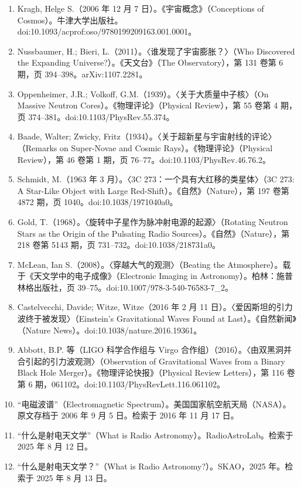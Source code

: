 \begin{enumerate}
  \item Kragh, Helge S.（2006 年 12 月 7 日）。《宇宙概念》（Conceptions of Cosmos）。牛津大学出版社。doi:10.1093/acprof:oso/9780199209163.001.0001。
  \item Nussbaumer, H.; Bieri, L.（2011）。〈谁发现了宇宙膨胀？〉（Who Discovered the Expanding Universe?）。《天文台》（The Observatory），第 131 卷第 6 期，页 394–398。arXiv:1107.2281。
  \item Oppenheimer, J.R.; Volkoff, G.M.（1939）。〈关于大质量中子核〉（On Massive Neutron Cores）。《物理评论》（Physical Review），第 55 卷第 4 期，页 374–381。doi:10.1103/PhysRev.55.374。
  \item Baade, Walter; Zwicky, Fritz（1934）。〈关于超新星与宇宙射线的评论〉（Remarks on Super-Novae and Cosmic Rays）。《物理评论》（Physical Review），第 46 卷第 1 期，页 76–77。doi:10.1103/PhysRev.46.76.2。
  \item Schmidt, M.（1963 年 3 月）。〈3C 273：一个具有大红移的类星体〉（3C 273: A Star-Like Object with Large Red-Shift）。《自然》（Nature），第 197 卷第 4872 期，页 1040。doi:10.1038/1971040a0。
  \item Gold, T.（1968）。〈旋转中子星作为脉冲射电源的起源〉（Rotating Neutron Stars as the Origin of the Pulsating Radio Sources）。《自然》（Nature），第 218 卷第 5143 期，页 731–732。doi:10.1038/218731a0。
  \item McLean, Ian S.（2008）。〈穿越大气的观测〉（Beating the Atmosphere）。载于《天文学中的电子成像》（Electronic Imaging in Astronomy）。柏林：施普林格出版社，页 39–75。doi:10.1007/978-3-540-76583-7\_2。
  \item Castelvecchi, Davide; Witze, Witze（2016 年 2 月 11 日）。〈爱因斯坦的引力波终于被发现〉（Einstein’s Gravitational Waves Found at Last）。《自然新闻》（Nature News）。doi:10.1038/nature.2016.19361。
  \item Abbott, B.P. 等（LIGO 科学合作组与 Virgo 合作组）（2016）。〈由双黑洞并合引起的引力波观测〉（Observation of Gravitational Waves from a Binary Black Hole Merger）。《物理评论快报》（Physical Review Letters），第 116 卷第 6 期，061102。doi:10.1103/PhysRevLett.116.061102。
  \item “电磁波谱”（Electromagnetic Spectrum）。美国国家航空航天局（NASA）。原文存档于 2006 年 9 月 5 日。检索于 2016 年 11 月 17 日。
  \item “什么是射电天文学”（What is Radio Astronomy）。RadioAstroLab。检索于 2025 年 8 月 12 日。
  \item “什么是射电天文学？”（What is Radio Astronomy?）。SKAO，2025 年。检索于 2025 年 8 月 13 日。

\end{enumerate}
